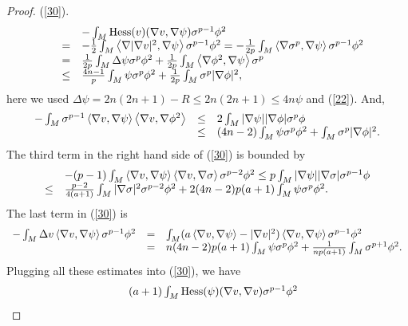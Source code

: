 \documentclass[12pt]{amsart}%
\numberwithin{equation}{section}
\begin{document}
\begin{proof}
(\ref{30}).
\[%
\begin{array}
[c]{lll}
&  & -\int_{M}\mathrm{Hess}(v)(\nabla v,\nabla\psi)\sigma^{p-1}\phi^{2}\\
& = & -\frac{1}{2}\int_{M}\left\langle \nabla|\nabla v|^{2},\nabla
\psi\right\rangle \sigma^{p-1}\phi^{2}=-\frac{1}{2p}\int_{M}\left\langle
\nabla\sigma^{p},\nabla\psi\right\rangle \sigma^{p-1}\phi^{2}\\
& = & \frac{1}{2p}\int_{M}\Delta\psi\sigma^{p}\phi^{2}+\frac{1}{2p}\int
_{M}\left\langle \nabla\phi^{2},\nabla\psi\right\rangle \sigma^{p}\\
& \leq & \frac{4n-1}{p}\int_{M}\psi\sigma^{p}\phi^{2}+\frac{1}{2p}\int
_{M}\sigma^{p}|\nabla\phi|^{2},
\end{array}
\]
here we used $\Delta\psi=2n(2n+1)-R\leq2n(2n+1)\leq4n\psi$ and (\ref{22}).
And,%
\[%
\begin{array}
[c]{lll}%
-\int_{M}\sigma^{p-1}\left\langle \nabla v,\nabla\psi\right\rangle
\left\langle \nabla v,\nabla\phi^{2}\right\rangle  & \leq & 2\int_{M}%
|\nabla\psi||\nabla\phi|\sigma^{p}\phi\\
& \leq & (4n-2)\int_{M}\psi\sigma^{p}\phi^{2}+\int_{M}\sigma^{p}|\nabla
\phi|^{2}.
\end{array}
\]
The third term in the right hand side of (\ref{30}) is bounded by%
\[%
\begin{array}
[c]{ll}
& -(p-1)\int_{M}\left\langle \nabla v,\nabla\psi\right\rangle \left\langle
\nabla v,\nabla\sigma\right\rangle \sigma^{p-2}\phi^{2}\leq p\int_{M}%
|\nabla\psi||\nabla\sigma|\sigma^{p-1}\phi\\
\leq & \frac{p-2}{4(a+1)}\int_{M}|\nabla\sigma|^{2}\sigma^{p-2}\phi
^{2}+2(4n-2)p(a+1)\int_{M}\psi\sigma^{p}\phi^{2}.
\end{array}
\]
The last term in (\ref{30}) is%
\[%
\begin{array}
[c]{lll}%
-\int_{M}\Delta v\left\langle \nabla v,\nabla\psi\right\rangle \sigma
^{p-1}\phi^{2} & = & \int_{M}(a\left\langle \nabla v,\nabla\psi\right\rangle
-|\nabla v|^{2})\left\langle \nabla v,\nabla\psi\right\rangle \sigma^{p-1}%
\phi^{2}\\
& = & n(4n-2)p(a+1)\int_{M}\psi\sigma^{p}\phi^{2}+\frac{1}{np(a+1)}\int
_{M}\sigma^{p+1}\phi^{2}.
\end{array}
\]
Plugging all these estimates into (\ref{30}), we have%
\begin{equation}%
\begin{array}
[c]{ll}
& (a+1)\int_{M}\mathrm{Hess}(\psi)(\nabla v,\nabla v)\sigma^{p-1}\phi^{2}\\

\end{array}
\end{equation}
\end{proof}
\end{document}
